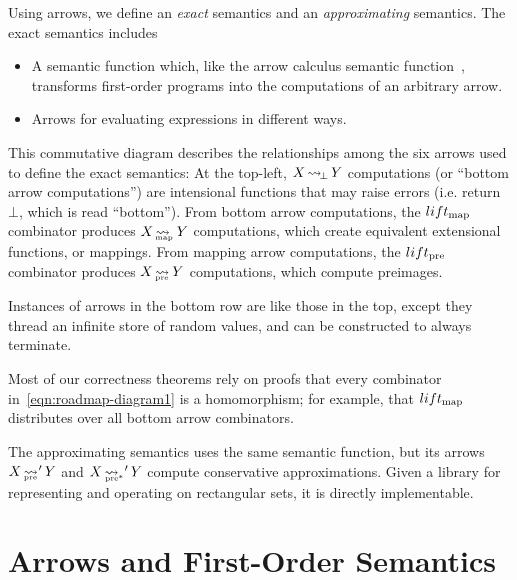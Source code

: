 Using arrows, we define an \emph{exact} semantics and an \emph{approximating} semantics.
The exact semantics includes
\begin{itemize}
	\item A semantic function which, like the arrow calculus semantic function~\cite{cit:lindley-2010jfp-arrow-calculus}, transforms first-order programs into the computations of an arbitrary arrow.
	\item Arrows for evaluating expressions in different ways.
\end{itemize}
This commutative diagram describes the relationships among the six arrows used to define the exact semantics:
At the top-left, $X \operatorname{\rightsquigarrow_{\mspace{-3mu}\bot}} Y$ computations (or ``bottom arrow computations'') are intensional functions that may raise errors (i.e. return $\bot$, which is read ``bottom'').
From bottom arrow computations, the $lift_\mathrm{map}$ combinator produces $X \operatorname{\rightsquigarrow_{\mspace{-23mu}_\mathrm{map}}} Y$ computations, which create equivalent extensional functions, or mappings.
From mapping arrow computations, the $lift_\mathrm{pre}$ combinator produces $X \operatorname{\rightsquigarrow_{\mspace{-22mu}_\mathrm{pre}}} Y$ computations, which compute preimages.

Instances of arrows in the bottom row are like those in the top, except they thread an infinite store of random values, and can be constructed to always terminate.

Most of our correctness theorems rely on proofs that every combinator in~\eqref{eqn:roadmap-diagram1} is a homomorphism; for example, that $lift_\mathrm{map}$ distributes over all bottom arrow combinators.

The approximating semantics uses the same semantic function, but its arrows $X \operatorname{\rightsquigarrow_{\mspace{-22mu}_\mathrm{pre}}}' Y$ and $X \operatorname{\rightsquigarrow_{\mspace{-21mu}_{\mathrm{pre*}}}}' Y$ compute conservative approximations.
Given a library for representing and operating on rectangular sets, it is directly implementable.


\section{Arrows and First-Order Semantics}

